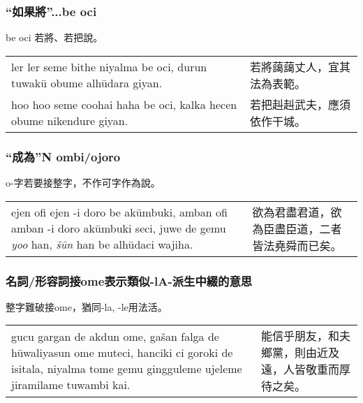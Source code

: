 \documentclass{article}
\begin{document}
\subsubsection{“如果將”...be oci}
\noindent be oci 若將、若把說。
\begin{center}
    \begin{tabularx}{\textwidth}{XX}
     ler ler seme bithe niyalma be oci, durun tuwak\={u} obume alh\={u}dara giyan. &若將藹藹丈人，宜其法為表範。\\
     hoo hoo seme coohai haha be oci, kalka hecen obume nikendure giyan. &若把赳赳武夫，應須依作干城。
    \end{tabularx}
\end{center}

\subsubsection{“成為”N ombi/ojoro}
\noindent o-字若要接整字，不作可字作為說。
\begin{center}
    \begin{tabularx}{\textwidth}{XX}
     ejen ofi ejen -i doro be ak\={u}mbuki, amban ofi amban -i doro ak\={u}mbuki seci, juwe de gemu \emph{yoo} han, \emph{\v{s}\={u}n} han be alh\={u}daci wajiha.& 欲為君盡君道，欲為臣盡臣道，二者皆法堯舜而已矣。
    \end{tabularx}
\end{center}

\subsubsection{名詞/形容詞接ome表示類似-lA-派生中綴的意思}
\noindent 整字難破接ome，猶同-la, -le用法活。
\begin{center}
    \begin{tabularx}{\textwidth}{XX}
     gucu gargan de akdun ome, ga\v{s}an falga de h\={u}waliyasun ome muteci, hanciki ci goroki de isitala, niyalma tome gemu gingguleme ujeleme jiramilame tuwambi kai. &能信乎朋友，和夫鄉黨，則由近及遠，人皆敬重而厚待之矣。
    \end{tabularx}
\end{center}
\end{document}
